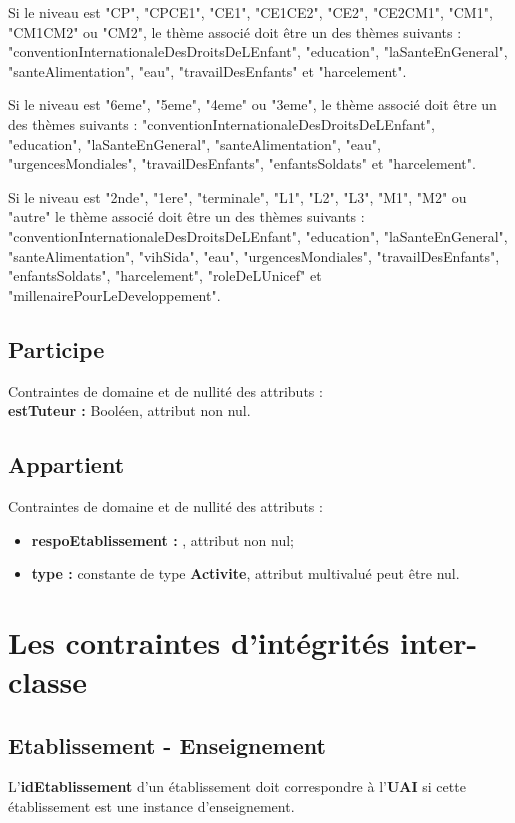 \documentclass[asi, sansVersion]{picInsa}
\begin{document}
Si le niveau est "CP", "CPCE1", "CE1", "CE1CE2", "CE2", "CE2CM1", "CM1", "CM1CM2" ou "CM2", le thème associé doit être un des thèmes suivants : "conventionInternationaleDesDroitsDeLEnfant", "education", "laSanteEnGeneral", "santeAlimentation", "eau", "travailDesEnfants" et "harcelement".

Si le niveau est "6eme", "5eme", "4eme" ou "3eme", le thème associé doit être un des thèmes suivants : "conventionInternationaleDesDroitsDeLEnfant", "education", "laSanteEnGeneral", "santeAlimentation", "eau", "urgencesMondiales", "travailDesEnfants", "enfantsSoldats" et "harcelement".

Si le niveau est "2nde", "1ere", "terminale", "L1", "L2", "L3", "M1", "M2" ou "autre" le thème associé doit être un des thèmes suivants : "conventionInternationaleDesDroitsDeLEnfant", "education", "laSanteEnGeneral", "santeAlimentation", "vihSida", "eau", "urgencesMondiales", "travailDesEnfants", "enfantsSoldats", "harcelement", "roleDeLUnicef" et "millenairePourLeDeveloppement".\\

\subsection*{Participe}
Contraintes de domaine et de nullité des attributs :\\
\indent \indent \textbf{estTuteur :} Booléen, attribut non nul.\\


\subsection*{Appartient}
Contraintes de domaine et de nullité des attributs :
\begin{itemize}
	\item \textbf{respoEtablissement :} , attribut non nul;
	\item \textbf{type :} constante de type \textbf{Activite}, attribut multivalué peut être nul.
\end{itemize}

\section{Les contraintes d'intégrités inter-classe}

\subsection*{Etablissement - Enseignement}
L'\textbf{idEtablissement} d'un établissement doit correspondre à l'\textbf{UAI} si cette établissement est une instance d'enseignement.\\
\end{document}

